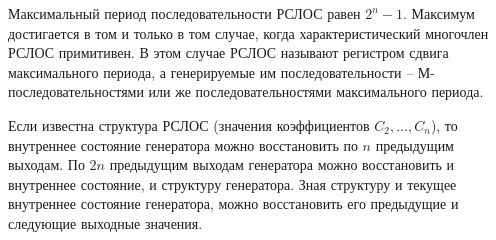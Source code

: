 \exampleend

Максимальный период последовательности РСЛОС равен $2^n - 1$. Максимум достигается в том и только в том случае, когда характеристический многочлен РСЛОС примитивен. В этом случае РСЛОС называют регистром сдвига максимального периода, а генерируемые им последовательности -- М-последовательностями или же последовательностями максимального периода.

Если известна структура РСЛОС (значения коэффициентов $C_2, \dots, C_n$), то внутреннее состояние генератора можно восстановить по $n$ предыдущим выходам. По $2n$ предыдущим выходам генератора можно восстановить и внутреннее состояние, и структуру генератора. Зная структуру и текущее внутреннее состояние генератора, можно восстановить его предыдущие и следующие выходные значения.
